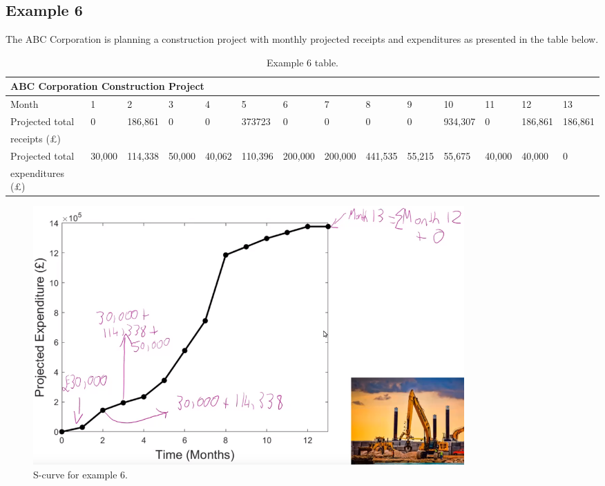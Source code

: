 \subsection{Example 6}
The ABC Corporation is planning a construction project with monthly projected receipts and expenditures as presented in the table below.
\begin{table}[H]
    \centering
    \small
    \setlength\tabcolsep{2pt}
    \begin{tabularx}{\textwidth}{@{}llllllllllllll@{}}
        \toprule
        \multicolumn{14}{l}{\textbf{ABC Corporation Construction Project}}                                                                                  \\
        \midrule
        Month                  & 1      & 2       & 3      & 4      & 5       & 6       & 7       & 8       & 9      & 10      & 11     & 12      & 13      \\
        Projected total        & 0      & 186,861 & 0      & 0      & 373723  & 0       & 0       & 0       & 0      & 934,307 & 0      & 186,861 & 186,861 \\
        receipts (\pounds)     &        &         &        &        &         &         &         &         &        &         &        &                   \\
        Projected total        & 30,000 & 114,338 & 50,000 & 40,062 & 110,396 & 200,000 & 200,000 & 441,535 & 55,215 & 55,675  & 40,000 & 40,000  & 0       \\
        expenditures (\pounds) &        &         &        &        &         &         &         &         &        &         &        &                   \\
        \bottomrule
    \end{tabularx}
    \caption{Example 6 table.}
\end{table}
\begin{figure}[H]
    \centering
    \includegraphics[width = 0.8\textwidth]{img/figure61.png}
    \caption{S-curve for example 6.}
\end{figure}
